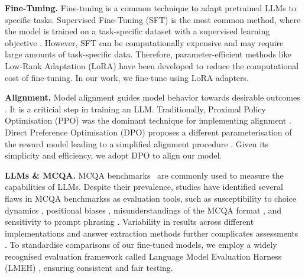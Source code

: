 \textbf{Fine-Tuning.} Fine-tuning is a common technique to adapt pretrained LLMs to specific tasks. Supervised Fine-Tuning (SFT) is the most common method, where the model is trained on a task-specific dataset with a supervised learning objective \cite{bert}. However, SFT can be computationally expensive and may require large amounts of task-specific data. Therefore, parameter-efficient methods like Low-Rank Adaptation (LoRA) \cite{lora} have been developed to reduce the computational cost of fine-tuning. In our work, we fine-tune using LoRA adapters.

\textbf{Alignment.} Model alignment guides model behavior towards desirable outcomes \cite{kaufmann2024survey}. It is a criticial step in training an LLM. Traditionally, Proximal Policy Optimisation (PPO) was the dominant technique for implementing alignment \cite{schulman2017proximal}. Direct Preference Optimisation (DPO) proposes a different parameterisation of the reward model leading to a simplified alignment procedure \cite{dpo}. Given its simplicity and efficiency, we adopt DPO to align our model.

\textbf{LLMs \& MCQA.} MCQA benchmarks~\cite{arc,sciq,mmlu} are commonly used to measure the capabilities of LLMs. Despite their prevalence, studies have identified several flaws in MCQA benchmarkss as evaluation tools, such as susceptibility to choice dynamics \cite{balepur2024artifacts}, positional biases \cite{li2024multiplechoice,khatun2024study,zheng2024large}, misunderstandings of the MCQA format \cite{khatun2024study}, and sensitivity to prompt phrasing \cite{khatun2023reliability}. Variability in results across different implementations and answer extraction methods further complicates assessments \cite{fourrier2023}. To standardise comparisons of our fine-tuned models, we employ a widely recognised evaluation framework called Language Model Evaluation Harness (LMEH) \cite{lmeh}, ensuring consistent and fair testing.
